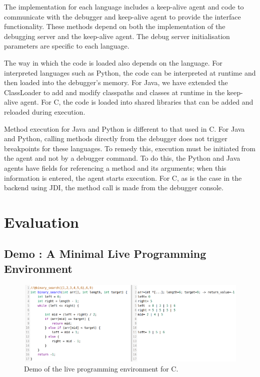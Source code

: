 \documentclass[english,submission]{programming}
\begin{document}
The implementation for each language includes a keep-alive agent and code to communicate with the debugger and keep-alive agent to provide the interface functionality.
These methods depend on both the implementation of the debugging server and the keep-alive agent. 
The debug server initialisation parameters are specific to each language.

The way in which the code is loaded also depends on the language. 
For interpreted languages such as Python, the code can be interpreted at runtime and then loaded into the debugger's memory. 
For Java, we have extended the ClassLoader to add and modify classpaths and classes at runtime in the keep-alive agent. 
For C, the code is loaded into shared libraries that can be added and reloaded during execution.

Method execution for Java and Python is different to that used in C. 
For Java and Python, calling methods directly from the debugger does not trigger breakpoints for these languages. 
To remedy this, execution must be initiated from the agent and not by a debugger command. 
To do this, the Python and Java agents have fields for referencing a method and its arguments; when this information is entered, the agent starts execution.
For C, as is the case in the backend using JDI, the method call is made from the debugger console.

\section{Evaluation}
\label{sec:evaluation}
\subsection{Demo : A Minimal Live Programming Environment}
\label{sec:demo-small-c}
\begin{figure}[htbp]
  \centering
  \includegraphics[width=\linewidth]{img/demo/c.png}
  \caption{Demo of the live programming environment for C.}
  \label{fig:demo}
\end{figure}
\end{document}
